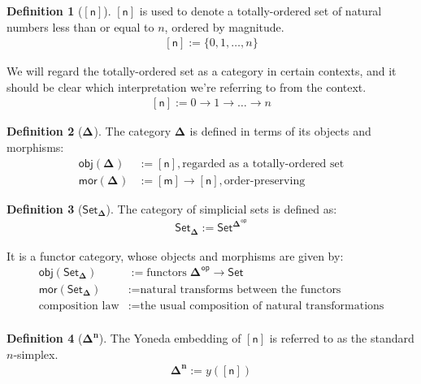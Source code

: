 \documentclass[10pt]{amsart}
\newcommand{\8}{\ensuremath{\infty}}
\newcommand{\0}{\ensuremath{\overset{\rightarrow}{0}}}
\newcommand{\1}{\ensuremath{\mathbf{1}}}
\newcommand{\obj}{\ensuremath{\mathsf{obj}}}
\newcommand{\mor}{\ensuremath{\mathsf{mor}}}
\newcommand{\Set}{\ensuremath{\mathsf{Set}}}
\newcommand{\Simplex}[1]{\ensuremath{\boldsymbol{\Delta^{#1}}}}
\newcommand{\SSet}{\ensuremath{\mathsf{Set}_{\boldsymbol{\Delta}}}}
\newcommand{\sq}[1]{\ensuremath{\mathsf{[#1]}}}
\newcommand{\op}{\ensuremath{\mathsf{op}}}
\theoremstyle{definition}
\newtheorem{definition}{Definition}[section]
\numberwithin{definition}{subsection}
\numberwithin{definition}{section}
\begin{document}
\begin{definition}[\sq{n}]
  $\sq{n}$ is used to denote a totally-ordered set of natural numbers less than or equal to $n$, ordered by magnitude.
  \begin{align*}
    \sq{n} := \{0, 1, \ldots, n\}
  \end{align*}

  We will regard the totally-ordered set as a category in certain contexts, and it should be clear which interpretation we're referring to from the context.
  \begin{align*}
    \sq{n} := 0 \rightarrow 1 \rightarrow \ldots \rightarrow n
  \end{align*}
\end{definition}

\begin{definition}[\Simplex{}]
  The category $\Simplex{}$ is defined in terms of its objects and morphisms:
  \begin{align*}
    \obj(\Simplex{}) & := \sq{n}, \text{regarded as a totally-ordered set}   \\
    \mor(\Simplex{}) & := \sq{m} \rightarrow \sq{n}, \text{order-preserving}
  \end{align*}
\end{definition}

\begin{definition}[\SSet]
  The category of simplicial sets is defined as:
  \begin{align*}
    \SSet := \Set^{\Simplex{}^\op}
  \end{align*}

  It is a functor category, whose objects and morphisms are given by:
  \begin{align*}
    \obj(\SSet)            & := \text{functors} \; \Simplex{}^\op \rightarrow \Set      \\
    \mor(\SSet)            & := \text{natural transforms between the functors}          \\
    \text{composition law} & := \text{the usual composition of natural transformations} \\
  \end{align*}
\end{definition}

\begin{definition}[\Simplex{n}]
  The Yoneda embedding of $\sq{n}$ is referred to as the standard $n$-simplex.
  \begin{align*}
    \Simplex{n} := y(\sq{n})
  \end{align*}
\end{definition}
\end{document}
